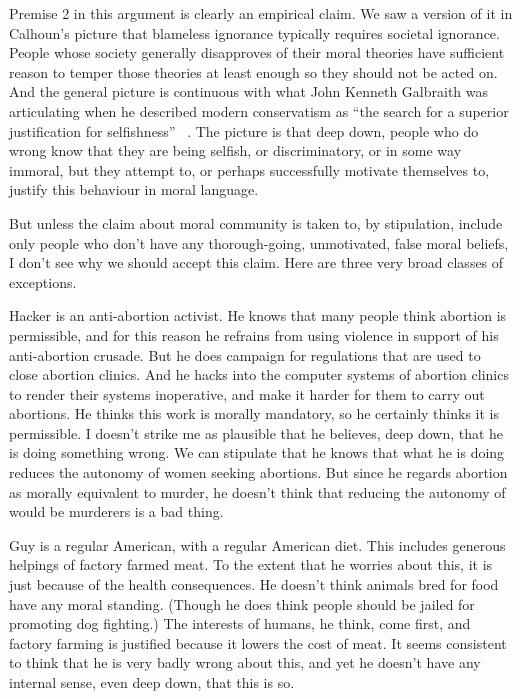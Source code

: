 Premise 2 in this argument is clearly an empirical claim. We saw a version of it in Calhoun's picture that blameless ignorance typically requires societal ignorance. People whose society generally disapproves of their moral theories have sufficient reason to temper those theories at least enough so they should not be acted on. And the general picture is continuous with what John Kenneth Galbraith was articulating when he described modern conservatism as ``the search for a superior justification for selfishness'' ~\citep[16]{Galbraith1964}. The picture is that deep down, people who do wrong know that they are being selfish, or discriminatory, or in some way immoral, but they attempt to, or perhaps successfully motivate themselves to, justify this behaviour in moral language.

But unless the claim about moral community is taken to, by stipulation, include only people who don't have any thorough-going, unmotivated, false moral beliefs, I don't see why we should accept this claim. Here are three very broad classes of exceptions.

\gls{Hacker} is an anti-abortion activist. He knows that many people think abortion is permissible, and for this reason he refrains from using violence in support of his anti-abortion crusade. But he does campaign for regulations that are used to close abortion clinics. And he hacks into the computer systems of abortion clinics to render their systems inoperative, and make it harder for them to carry out abortions. He thinks this work is morally mandatory, so he certainly thinks it is permissible. I doesn't strike me as plausible that he believes, deep down, that he is doing something wrong. We can stipulate that he knows that what he is doing reduces the autonomy of women seeking abortions. But since he regards abortion as morally equivalent to murder, he doesn't think that reducing the autonomy of would be murderers is a bad thing.

\gls{Guy} is a regular American, with a regular American diet. This includes generous helpings of factory farmed meat. To the extent that he worries about this, it is just because of the health consequences. He doesn't think animals bred for food have any moral standing. (Though he does think people should be jailed for promoting dog fighting.) The interests of humans, he think, come first, and factory farming is justified because it lowers the cost of meat. It seems consistent to think that he is very badly wrong about this, and yet he doesn't have any internal sense, even deep down, that this is so.

